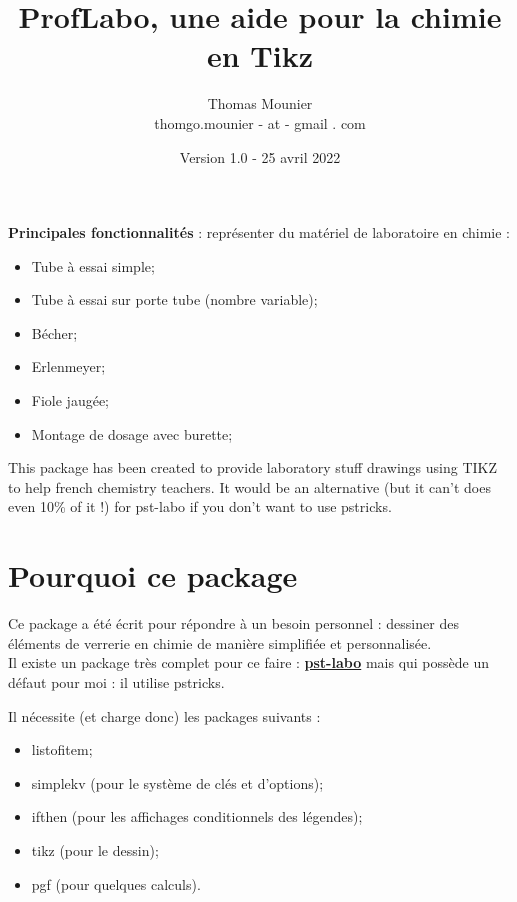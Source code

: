 \documentclass[a4paper,12pt,dvipsnames]{report}
\title{ProfLabo, une aide pour la chimie en Tikz}
\author{Thomas Mounier \\ thomgo.mounier - at - gmail . com}
\date{Version 1.0 - 25 avril 2022}
\newcommand{\cadre}[1]{ \begin{enc} #1 \end{enc}}
\begin{document}
{\let\newpage\relax\maketitle}
\vspace{-3cm}

\begin{center}
\end{center}
\vspace{0.5cm}

\cadre{\textbf{Principales fonctionnalités} : représenter du matériel de laboratoire en chimie :
\begin{itemize}
\item Tube à essai simple;
\item Tube à essai sur porte tube (nombre variable);
\item Bécher;
\item Erlenmeyer;
\item Fiole jaugée;
\item Montage de dosage avec burette;
\end{itemize}
 }

\vspace{1cm}

This package has been created to provide laboratory stuff drawings using TIKZ to help french chemistry teachers. It would be an alternative (but it can't does even 10\% of it !) for pst-labo if you don't want to use pstricks.

\newpage
\tableofcontents


\newpage
\thispagestyle{fancy}
\chapter{Pourquoi ce package}
\thispagestyle{fancy}
Ce package a été écrit pour répondre à un besoin personnel : dessiner des éléments de verrerie en chimie de manière simplifiée et personnalisée.\\
Il existe un package très complet pour ce faire : \textbf{\textcolor{YellowOrange}{\href{https://ctan.org/pkg/pst-labo?lang=en}{pst-labo}}} mais qui possède un défaut pour moi : il utilise pstricks.
\vspace{1cm}

Il nécessite (et charge donc) les packages suivants :
\begin{itemize}
\item listofitem;
\item simplekv (pour le système de clés et d'options);
\item ifthen (pour les affichages conditionnels des légendes);
\item tikz (pour le dessin);
\item pgf (pour quelques calculs).
\end{itemize}
\end{document}
